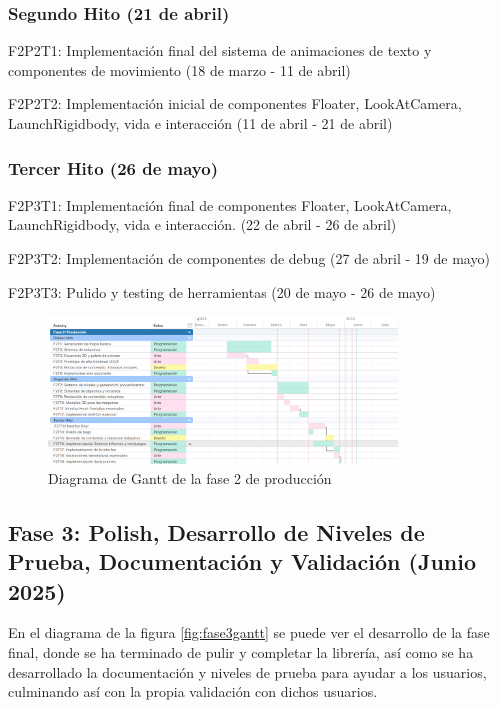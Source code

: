 \subsubsection{Segundo Hito (21 de abril)}

\begin{compactitem}
\item F2P2T1: Implementación final del sistema de animaciones de texto y componentes de movimiento (18 de marzo - 11 de abril)
\item F2P2T2: Implementación inicial de componentes Floater, LookAtCamera, LaunchRigidbody, vida e interacción (11 de abril - 21 de abril)
\end{compactitem}

\subsubsection{Tercer Hito (26 de mayo)}

\begin{compactitem}
\item F2P3T1: Implementación final de componentes Floater, LookAtCamera, LaunchRigidbody, vida e interacción. (22 de abril - 26 de abril)
\item F2P3T2: Implementación de componentes de debug (27 de abril - 19 de mayo)
\item F2P3T3: Pulido y testing de herramientas (20 de mayo - 26 de mayo)
\end{compactitem}

\begin{figure}[H]
  \centering
	\includegraphics[width=350px,clip=true]{gantt2.png}
  \caption{Diagrama de Gantt de la fase 2 de producción}
  \label{fig:fase2gantt}
\end{figure}

\subsection{Fase 3: Polish, Desarrollo de Niveles de Prueba, Documentación y Validación (Junio 2025)}

En el diagrama de la figura \ref{fig:fase3gantt} se puede ver el desarrollo de la fase final, donde se ha terminado de pulir y completar la librería, 
así como se ha desarrollado la documentación y niveles de prueba para ayudar a los usuarios, culminando así con la propia validación con dichos usuarios.

